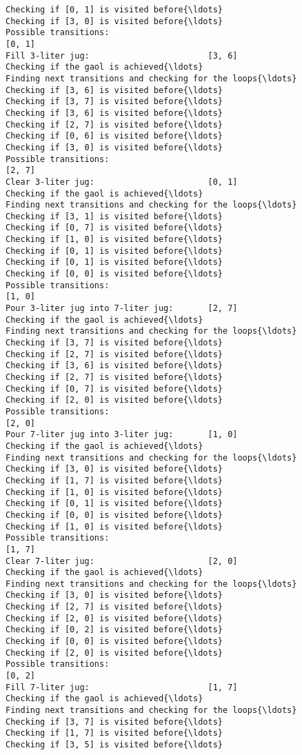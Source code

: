 \documentclass[11pt]{article}
\begin{document}
\begin{Verbatim}[commandchars=\\\{\}]
Checking if [0, 1] is visited before{\ldots}
Checking if [3, 0] is visited before{\ldots}
Possible transitions:
[0, 1]
Fill 3-liter jug:                        [3, 6]
Checking if the gaol is achieved{\ldots}
Finding next transitions and checking for the loops{\ldots}
Checking if [3, 6] is visited before{\ldots}
Checking if [3, 7] is visited before{\ldots}
Checking if [3, 6] is visited before{\ldots}
Checking if [2, 7] is visited before{\ldots}
Checking if [0, 6] is visited before{\ldots}
Checking if [3, 0] is visited before{\ldots}
Possible transitions:
[2, 7]
Clear 3-liter jug:                       [0, 1]
Checking if the gaol is achieved{\ldots}
Finding next transitions and checking for the loops{\ldots}
Checking if [3, 1] is visited before{\ldots}
Checking if [0, 7] is visited before{\ldots}
Checking if [1, 0] is visited before{\ldots}
Checking if [0, 1] is visited before{\ldots}
Checking if [0, 1] is visited before{\ldots}
Checking if [0, 0] is visited before{\ldots}
Possible transitions:
[1, 0]
Pour 3-liter jug into 7-liter jug:       [2, 7]
Checking if the gaol is achieved{\ldots}
Finding next transitions and checking for the loops{\ldots}
Checking if [3, 7] is visited before{\ldots}
Checking if [2, 7] is visited before{\ldots}
Checking if [3, 6] is visited before{\ldots}
Checking if [2, 7] is visited before{\ldots}
Checking if [0, 7] is visited before{\ldots}
Checking if [2, 0] is visited before{\ldots}
Possible transitions:
[2, 0]
Pour 7-liter jug into 3-liter jug:       [1, 0]
Checking if the gaol is achieved{\ldots}
Finding next transitions and checking for the loops{\ldots}
Checking if [3, 0] is visited before{\ldots}
Checking if [1, 7] is visited before{\ldots}
Checking if [1, 0] is visited before{\ldots}
Checking if [0, 1] is visited before{\ldots}
Checking if [0, 0] is visited before{\ldots}
Checking if [1, 0] is visited before{\ldots}
Possible transitions:
[1, 7]
Clear 7-liter jug:                       [2, 0]
Checking if the gaol is achieved{\ldots}
Finding next transitions and checking for the loops{\ldots}
Checking if [3, 0] is visited before{\ldots}
Checking if [2, 7] is visited before{\ldots}
Checking if [2, 0] is visited before{\ldots}
Checking if [0, 2] is visited before{\ldots}
Checking if [0, 0] is visited before{\ldots}
Checking if [2, 0] is visited before{\ldots}
Possible transitions:
[0, 2]
Fill 7-liter jug:                        [1, 7]
Checking if the gaol is achieved{\ldots}
Finding next transitions and checking for the loops{\ldots}
Checking if [3, 7] is visited before{\ldots}
Checking if [1, 7] is visited before{\ldots}
Checking if [3, 5] is visited before{\ldots}

\end{Verbatim}
\end{document}

